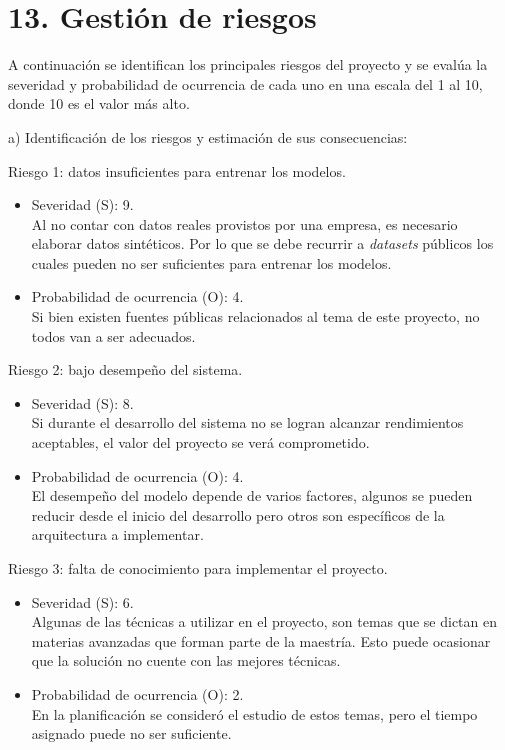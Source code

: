 \documentclass[
11pt, %
]{charter}
\begin{document}
\section{13. Gestión de riesgos}
\label{sec:riesgos}

A continuación se identifican los principales riesgos del proyecto y se evalúa la severidad y probabilidad de ocurrencia de cada uno en una escala del 1 al 10, donde 10 es el valor más alto.

a) Identificación de los riesgos y estimación de sus consecuencias:
 
Riesgo 1: datos insuficientes para entrenar los modelos.
\begin{itemize}
	\item Severidad (S): 9.\\
	Al no contar con datos reales provistos por una empresa, es necesario elaborar datos sintéticos. Por lo que se debe recurrir a \textit{datasets} públicos los cuales pueden no ser suficientes para entrenar los modelos.
	\item Probabilidad de ocurrencia (O): 4.\\
	Si bien existen fuentes públicas relacionados al tema de este proyecto, no todos van a ser adecuados.
\end{itemize}

Riesgo 2: bajo desempeño del sistema.
\begin{itemize}
	\item Severidad (S): 8.\\
	Si durante el desarrollo del sistema no se logran alcanzar rendimientos aceptables, el valor del proyecto se verá comprometido.
	\item Probabilidad de ocurrencia (O): 4.\\
	El desempeño del modelo depende de varios factores, algunos se pueden reducir desde el inicio del desarrollo pero otros son específicos de la arquitectura a implementar.
\end{itemize}

Riesgo 3: falta de conocimiento para implementar el proyecto.
\begin{itemize}
	\item Severidad (S):  6.\\
	Algunas de las técnicas a utilizar en el proyecto, son temas que se dictan en materias avanzadas que forman parte de la maestría. Esto puede ocasionar que la solución no cuente con las mejores técnicas.
	\item Probabilidad de ocurrencia (O): 2.\\
	En la planificación se consideró el estudio de estos temas, pero el tiempo asignado puede no ser suficiente.
\end{itemize}
\end{document}
